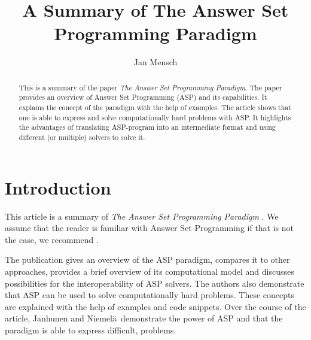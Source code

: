 \documentclass[runningheads]{llncs}
\newcommand{\papertitle}{The Answer Set Programming Paradigm}
\newcommand{\authorquote}{Janhunen and Niemelä~}
\begin{document}
\title{A Summary of \papertitle}

\author{Jan Mensch}




%
\maketitle              %
%
\begin{abstract}
This is a summary of the paper \textit{\papertitle}. The paper provides an overview of Answer Set Programming (ASP) and its capabilities. It explains the concept of the paradigm with the help of examples. The article shows that one is able to express and solve computationally hard problems with ASP. It highlights the advantages of translating ASP-program into an intermediate format and using different (or multiple) solvers to solve it.



\end{abstract}

\section{Introduction}
This article is a summary of \textit{\papertitle} \cite{janhunen2016answer}. We assume that the reader is familiar with Answer Set Programming if that is not the case, we recommend \cite{erdem2016applications}. 

The publication gives an overview of the ASP paradigm, compares it to other approaches, provides a brief overview of its computational model and discusses possibilities for the interoperability of ASP solvers. The authors also demonstrate that ASP can be used to solve computationally hard problems. These concepts are explained with the help of examples and code snippets. Over the course of the article, \authorquote demonstrate the power of ASP and that the paradigm is able to express difficult,  problems. 

\end{document}
